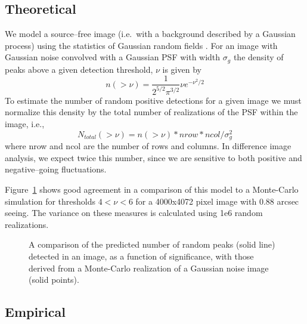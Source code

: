 \documentclass[prd, nofootinbib, floatfix, 11pt,tightenlines,times]{article}
\begin{document}
\subsection{Theoretical \label{sec-analyticfp}}

We model a source--free image (i.e.\ with a background described by a
Gaussian process) using the statistics of Gaussian random fields \citep{Kaiser-PointSources}.  
For an image with Gaussian noise convolved with a
Gaussian PSF with width $\sigma_g$ the density of peaks above a given
detection threshold, $\nu$ is given by 
\begin{equation}
n(>\nu) = \frac{1}{2^{5/2}\pi^{3/2}} \nu e^{-\nu^2 /2} 
\label{eq-theory}
\end{equation}
To estimate the number of random
positive detections for a given image we must normalize this density
by the total number of realizations of the PSF within the image, i.e.,
\begin{equation}
N_{total}(>\nu) = n(>\nu)*nrow*ncol/ \sigma_g^2
\end{equation}
where nrow and ncol are the number of rows and columns.  
In difference image analysis, we expect
twice this number, since we are sensitive to both positive and negative--going
fluctuations.

Figure~\ref{fig:peaks} shows good agreement in a comparison of this
model to a Monte-Carlo simulation for thresholds $4<\nu<6$ for a
4000x4072 pixel image with 0.88 arcsec seeing. The variance on these
measures is calculated using 1e6 random realizations.
\begin{figure}
\caption{A comparison of the predicted number of random peaks (solid
  line) detected in an image, as a function of significance, with
  those derived from a Monte-Carlo realization of a Gaussian noise
  image (solid points).}
\label{fig:peaks}
\end{figure}

\subsection{Empirical}
\end{document}
